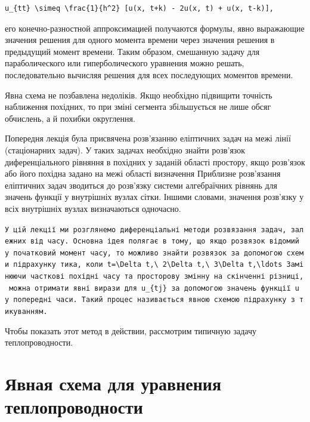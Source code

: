 \documentclass[
  ukrainian,
]{article}
\begin{document}
\begin{verbatim}
u_{tt} \simeq \frac{1}{h^2} [u(x, t+k) - 2u(x, t) + u(x, t-k)],
\end{verbatim}

его конечно-разностной аппроксимацией получаются формулы, явно
выражающие значения решения для одного момента времени через значения
решения в предыдущий момент времени. Таким образом, смешанную задачу для
параболического или гиперболического уравнения можно решать,
последовательно вычисляя решения для всех последующих моментов времени.

Явна схема не позбавлена недоліків. Якщо необхідно підвищити точність
наближення похідних, то при зміні сегмента збільшується не лише обсяг
обчислень, а й похибки округлення.

Попередня лекція була присвячена розв'язанню еліптичних задач на межі
лінії (стаціонарних задач). У таких задачах необхідно знайти розв'язок
диференціального рівняння в похідних у заданій області простору, якщо
розв'язок або його похідна задано на межі області визначення Приблизне
розв'язання еліптичних задач зводиться до розв'язку системи алгебраїчних
рівнянь для значень функції у внутрішніх вузлах сітки. Іншими словами,
значення розв'язку у всіх внутрішніх вузлах визначаються одночасно.

\texttt{У\ цій\ лекції\ ми\ розглянемо\ диференціальні\ методи\ розв\textquotesingle{}язання\ задач,\ залежних\ від\ часу.\ Основна\ ідея\ полягає\ в\ тому,\ що\ якщо\ розв\textquotesingle{}язок\ відомий\ у\ початковий\ момент\ часу,\ то\ можливо\ знайти\ розв\textquotesingle{}язок\ за\ допомогою\ схеми\ підрахунку\ тика,\ коли\ \textquotesingle{}t=\textbackslash{}Delta\ t,\textbackslash{}\ 2\textbackslash{}Delta\ t,\textbackslash{}\ 3\textbackslash{}Delta\ t,\textbackslash{}ldots\textquotesingle{}\ Замінюючи\ часткові\ похідні\ часу\ та\ просторову\ змінну\ на\ скінченні\ різниці,\ можна\ отримати\ явні\ вирази\ для\ \textquotesingle{}u\_\{tj\}\textquotesingle{}\ за\ допомогою\ значень\ функції\ u\ у\ попередні\ часи.\ Такий\ процес\ називається\ явною\ схемою\ підрахунку\ з\ тикуванням.}

Чтобы показать этот метод в действии, рассмотрим типичную задачу
теплопроводности.

\section{Явная схема для уравнения
теплопроводности}\label{ux44fux432ux43dux430ux44f-ux441ux445ux435ux43cux430-ux434ux43bux44f-ux443ux440ux430ux432ux43dux435ux43dux438ux44f-ux442ux435ux43fux43bux43eux43fux440ux43eux432ux43eux434ux43dux43eux441ux442ux438}
\end{document}

